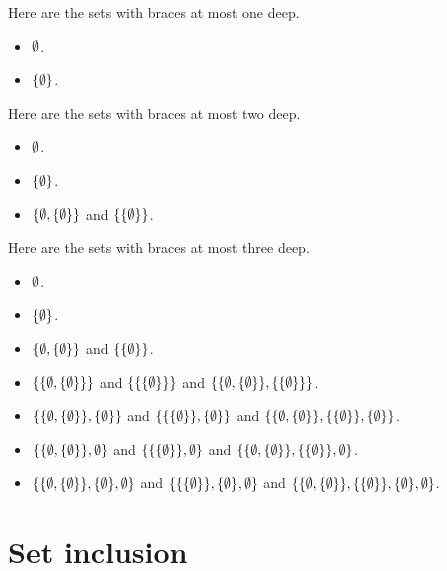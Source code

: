 \documentclass{report}
\begin{document}
\begin{solution}
Here are the sets with braces at most one deep.
\begin{itemize}
    \item $\emptyset$.
    \item $\left\{\emptyset\right\}$.
\end{itemize}

Here are the sets with braces at most two deep.
\begin{itemize}
    \item $\emptyset$.
    \item $\left\{\emptyset\right\}$.
    \item $\left\{\emptyset, \left\{\emptyset\right\}\right\}$ and $\left\{\left\{\emptyset\right\}\right\}$.
\end{itemize}

Here are the sets with braces at most three deep.
\begin{itemize}
    \item $\emptyset$.
    \item $\left\{\emptyset\right\}$.
    \item $\left\{\emptyset, \left\{\emptyset\right\}\right\}$ and $\left\{\left\{\emptyset\right\}\right\}$.
    \item $\left\{\left\{\emptyset, \left\{\emptyset\right\}\right\}\right\}$ and $\left\{\left\{\left\{\emptyset\right\}\right\}\right\}$ and
    $\set{\set{\eset, \set{\eset}}, \set{\set{\eset}}}$.
    \item $\set{\set{\eset, \set{\eset}}, \set{\eset}}$ and $\set{\set{\set{\eset}}, \set{\eset}}$ and
    $\set{\set{\eset, \set{\eset}}, \set{\set{\eset}}, \set{\eset}}$.
    \item $\set{\set{\eset, \set{\eset}}, \eset}$ and $\set{\set{\set{\eset}}, \eset}$ and
    $\set{\set{\eset, \set{\eset}}, \set{\set{\eset}}, \eset}$.
    \item $\set{\set{\eset, \set{\eset}}, \set{\eset}, \eset}$ and $\set{\set{\set{\eset}}, \set{\eset}, \eset}$ and
    $\set{\set{\eset, \set{\eset}}, \set{\set{\eset}}, \set{\eset}, \eset}$.
\end{itemize}

\end{solution}

\section{Set inclusion}
\end{document}
